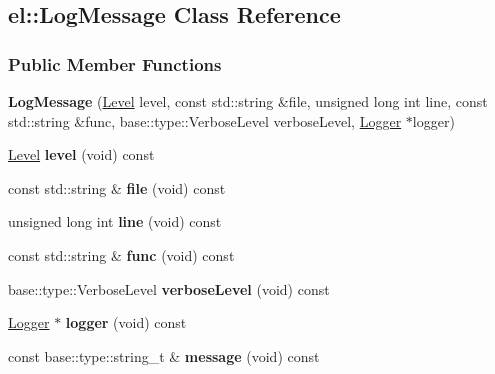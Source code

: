 \hypertarget{a00050}{}\subsection{el\+:\+:Log\+Message Class Reference}
\label{a00050}
\subsubsection*{Public Member Functions}
\begin{DoxyCompactItemize}
\item 
\hypertarget{a00050_a6cb875167d28c57e11877f833d733e04}{}{\bfseries Log\+Message} (\hyperlink{a00183_ab0ac6091262344c52dd2d3ad099e8e36}{Level} level, const std\+::string \&file, unsigned long int line, const std\+::string \&func, base\+::type\+::\+Verbose\+Level verbose\+Level, \hyperlink{a00048}{Logger} $\ast$logger)\label{a00050_a6cb875167d28c57e11877f833d733e04}

\item 
\hypertarget{a00050_a09514a3bb7deae447c3141bc55b52d06}{}\hyperlink{a00183_ab0ac6091262344c52dd2d3ad099e8e36}{Level} {\bfseries level} (void) const \label{a00050_a09514a3bb7deae447c3141bc55b52d06}

\item 
\hypertarget{a00050_a8f72164d7bf31ea3b15a5c0201fca0c4}{}const std\+::string \& {\bfseries file} (void) const \label{a00050_a8f72164d7bf31ea3b15a5c0201fca0c4}

\item 
\hypertarget{a00050_a4bc97e6670d890cae719e3e9680b8373}{}unsigned long int {\bfseries line} (void) const \label{a00050_a4bc97e6670d890cae719e3e9680b8373}

\item 
\hypertarget{a00050_ae09cdff5620dcf8269b2b83bea722a2a}{}const std\+::string \& {\bfseries func} (void) const \label{a00050_ae09cdff5620dcf8269b2b83bea722a2a}

\item 
\hypertarget{a00050_a52e91b0dd3e5af96642622cc2a67aa88}{}base\+::type\+::\+Verbose\+Level {\bfseries verbose\+Level} (void) const \label{a00050_a52e91b0dd3e5af96642622cc2a67aa88}

\item 
\hypertarget{a00050_ae67b30a16a4115148ee32c9b2c91e03c}{}\hyperlink{a00048}{Logger} $\ast$ {\bfseries logger} (void) const \label{a00050_ae67b30a16a4115148ee32c9b2c91e03c}

\item 
\hypertarget{a00050_a0f34882ed8102061bb9bb247cb08a5c3}{}const base\+::type\+::string\+\_\+t \& {\bfseries message} (void) const \label{a00050_a0f34882ed8102061bb9bb247cb08a5c3}

\end{DoxyCompactItemize}
